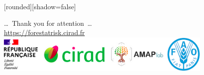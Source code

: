 \documentclass[10pt,table,dvipsnames,compress]{beamer}
\begin{document}

{
  [rounded][shadow=false]
  \begin{frame}[plain]
    \begin{block}{}
      \begin{center}
        \ldots~Thank you for attention~\ldots \\
        \url{https://forestatrisk.cirad.fr} \\
        \includegraphics[width=0.8\textwidth]{figs/partners_logos}
      \end{center}
    \end{block}
  \end{frame}
}
\end{document}
